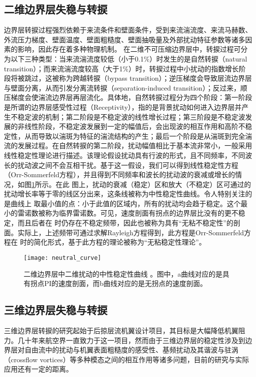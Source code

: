 \subsection{二维边界层失稳与转捩}
边界层转捩过程强烈依赖于来流条件和壁面条件，受到来流湍流度、来流马赫数、外流压力梯度、壁面温度、壁面粗糙度、壁面抽吸量及外部扰动特征参数等诸多因素的影响\cite{morkovin1969many}，因此存在着多种物理机制。
在二维不可压缩边界层中，转捩过程可分为以下三种类型：当来流湍流度较低（小于0.1\%）时发生的是自然转捩（natural transition）\cite{papanastasiou1999viscous}；而来流湍流度较高（大于1\%）时，转捩过程中小扰动的指数增长阶段将被跳过，这被称为跨越转捩（bypass transition）\cite{jacobs2001simulations}；逆压梯度会导致层流边界层与壁面分离，从而引发分离流转捩（separation-induced transition）\cite{malkiel1995transition}；反过来，顺压梯度会使湍流边界层再层流化\cite{walker1992role}。具体地，自然转捩过程分为四个阶段\cite{bradshaw1994turbulence}：第一阶段是所谓的边界层感受性过程（Receptivity）\cite{reshotko1984environment}，指的是背景扰动如何进入边界层并产生不稳定波的机制；第二阶段是不稳定波的线性增长过程；第三阶段是不稳定波发展的非线性阶段，不稳定波发展到一定的幅值后，会出现波的相互作用和高阶不稳定性，从而导致以湍斑为特征的湍流结构的产生；最后一个阶段是从湍斑到完全湍流的发展过程。在自然转捩的第二阶段，扰动幅值相比于基本流非常小，一般采用线性稳定性理论进行描述。该理论假设扰动具有行波的形式，且不同频率，不同波长的扰动波之间不会互相干扰。基于这一假设，我们可以得到线性稳定性方程（Orr-Sommerfeld方程），并且得到不同频率和波长的扰动波的衰减或增长的情况，如图\ref{f:neutral_curve}所示。在此 图上，扰动的衰减（稳定）区和放大（不稳定）区可通过的扰动增长率等于零的线区分出来，这条线被称为中性稳定性曲线。令人特别关注的是曲线上 取最小值的点：小于此值的区域内，所有的扰动均会趋于稳定。这个最小的雷诺数被称为临界雷诺数。可见，速度剖面有拐点的边界层比没有的更不稳定，而且后者在 时仍存在不稳定频带，因此也被称为具有“无粘不稳定性”的剖面。实际上，上述频带可通过求解Rayleigh方程\cite{Schlichting1979}得到，此方程是Orr-Sommerfeld方程在 时的简化形式，基于此方程的理论被称为“无粘稳定性理论”。
\begin{figure}
  \centering
  \texttt{[image: neutral\_curve]}
  \caption{二维边界层中二维扰动的中性稳定性曲线\cite{Schlichting1979}
  。图中，a曲线对应的是具有拐点PI的速度剖面，而b曲线对应的是无拐点的速度剖面。}\label{f:neutral_curve}
\end{figure}

\subsection{三维边界层失稳与转捩}
三维边界层转捩的研究起始于后掠层流机翼设计项目\cite{Gray1952}，其目标是大幅降低机翼阻力。几十年来航空界一直致力于这一项目，然而由于三维边界层的稳定性涉及到边界层对自由流中的扰动与机翼表面粗糙度的感受性、基频扰动及其谐波与驻涡（crossflow vortices）等多种模态之间的相互作用等诸多问题，目前的研究与实际应用还有一定的距离。

